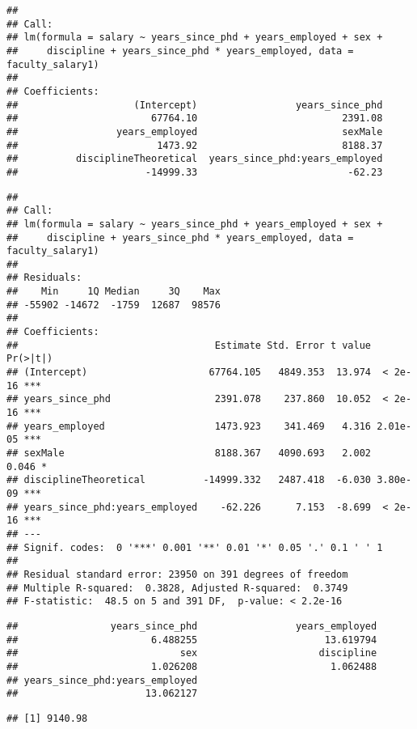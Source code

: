 \documentclass[]{article}
\begin{document}
\begin{verbatim}
## 
## Call:
## lm(formula = salary ~ years_since_phd + years_employed + sex + 
##     discipline + years_since_phd * years_employed, data = faculty_salary1)
## 
## Coefficients:
##                    (Intercept)                 years_since_phd  
##                       67764.10                         2391.08  
##                 years_employed                         sexMale  
##                        1473.92                         8188.37  
##          disciplineTheoretical  years_since_phd:years_employed  
##                      -14999.33                          -62.23
\end{verbatim}

\begin{verbatim}
## 
## Call:
## lm(formula = salary ~ years_since_phd + years_employed + sex + 
##     discipline + years_since_phd * years_employed, data = faculty_salary1)
## 
## Residuals:
##    Min     1Q Median     3Q    Max 
## -55902 -14672  -1759  12687  98576 
## 
## Coefficients:
##                                  Estimate Std. Error t value Pr(>|t|)    
## (Intercept)                     67764.105   4849.353  13.974  < 2e-16 ***
## years_since_phd                  2391.078    237.860  10.052  < 2e-16 ***
## years_employed                   1473.923    341.469   4.316 2.01e-05 ***
## sexMale                          8188.367   4090.693   2.002    0.046 *  
## disciplineTheoretical          -14999.332   2487.418  -6.030 3.80e-09 ***
## years_since_phd:years_employed    -62.226      7.153  -8.699  < 2e-16 ***
## ---
## Signif. codes:  0 '***' 0.001 '**' 0.01 '*' 0.05 '.' 0.1 ' ' 1
## 
## Residual standard error: 23950 on 391 degrees of freedom
## Multiple R-squared:  0.3828, Adjusted R-squared:  0.3749 
## F-statistic:  48.5 on 5 and 391 DF,  p-value: < 2.2e-16
\end{verbatim}

\begin{verbatim}
##                years_since_phd                 years_employed 
##                       6.488255                      13.619794 
##                            sex                     discipline 
##                       1.026208                       1.062488 
## years_since_phd:years_employed 
##                      13.062127
\end{verbatim}

\begin{verbatim}
## [1] 9140.98
\end{verbatim}
\end{document}
